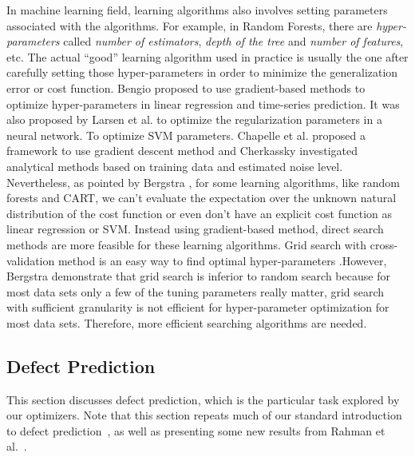In  machine learning field,  learning algorithms also involves setting parameters associated with the algorithms. For example, in Random Forests\cite{breiman2001random}, there are {\it hyper-parameters} called {\it number of estimators}, {\it depth of the tree} and {\it number of features}, etc. The actual ``good'' learning algorithm used in practice is usually the one after carefully setting those hyper-parameters in order to minimize the generalization error or cost function\cite{larsen1998adaptive,chapelle2002choosing,cherkassky2004practical,bengio2000gradient}. Bengio \cite{bengio2000gradient} proposed to use gradient-based methods to optimize hyper-parameters in linear regression and time-series prediction. It was also proposed by Larsen et al.\cite{larsen1998adaptive} to optimize the regularization parameters in a neural network. To optimize SVM parameters. Chapelle et al. proposed a framework to use gradient descent method\cite{chapelle2002choosing} and Cherkassky investigated analytical methods based on training data and estimated noise level\cite{cherkassky2004practical}. Nevertheless, as pointed by Bergstra \cite{Bergstra2012}, for some learning algorithms, like random forests and CART, we can't evaluate the expectation over the unknown natural distribution of the cost function or even don't have an explicit cost function as linear regression or SVM. Instead using gradient-based method, direct search methods are more feasible for these learning algorithms. Grid search with cross-validation method is an easy way to find optimal hyper-parameters \cite{lerman1980fitting,hsu2003practical,jimenez2009finding,akay2009support}.However, Bergstra \cite{Bergstra2012} demonstrate that grid search is inferior to random search because for most data sets only a few of the tuning parameters really matter, grid search with  sufficient granularity is not efficient for hyper-parameter optimization for most data sets. Therefore, more efficient searching algorithms are needed.

\subsection{Defect Prediction}


This section discusses defect prediction,
which is the particular
task explored by our optimizers.
Note that this section repeats much of 
our standard introduction to defect prediction~\cite{me15:book1},
as well as presenting    some new results from Rahman et al.~\cite{rahman14:icse}. 
 



